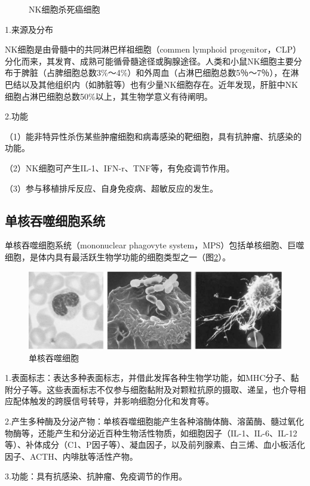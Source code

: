\begin{figure}[!htbp]
\begin{minipage}[b]{0.45\textwidth}
    \captionsetup{justification=centering}
    \caption{NK细胞杀死癌细胞}
    \label{fig2-20}
\end{minipage}
\end{figure} 

1.来源及分布

NK细胞是由骨髓中的共同淋巴样祖细胞（commen lymphoid
progenitor，CLP）分化而来，其发育、成熟可能循骨髓途径或胸腺途径。人类和小鼠NK细胞主要分布于脾脏（占脾细胞总数3\%～4\%）和外周血（占淋巴细胞总数5％～7％），在淋巴结以及其他组织内（如肺脏等）也有少量NK细胞存在。近年发现，肝脏中NK细胞占淋巴细胞总数50\%以上，其生物学意义有待阐明。

2.功能

（1）能非特异性杀伤某些肿瘤细胞和病毒感染的靶细胞，具有抗肿瘤、抗感染的功能。

（2）NK细胞可产生IL-1、IFN-r、TNF等，有免疫调节作用。

（3）参与移植排斥反应、自身免疫病、超敏反应的发生。


\subsection{单核吞噬细胞系统}

单核吞噬细胞系统（mononuclear phagovyte
system，MPS）包括单核细胞、巨噬细胞，是体内具有最活跃生物学功能的细胞类型之一（图\ref{fig2-21}）。

\begin{figure}[!htbp]
 \centering
 \includegraphics[width=.7\textwidth]{./images/Image00046.jpg}
 \caption{单核吞噬细胞}
 \label{fig2-21}
  \end{figure} 

1.表面标志：表达多种表面标志，并借此发挥各种生物学功能，如MHC分子、黏附分子等。这些表面标志不仅参与细胞黏附及对颗粒抗原的摄取、递呈，也介导相应配体触发的跨膜信号转导，并影响细胞分化和发育等。

2.产生多种酶及分泌产物：单核吞噬细胞能产生各种溶酶体酶、溶菌酶、髓过氧化物酶等，还能产生和分泌近百种生物活性物质，如细胞因子（IL-1、IL-6、IL-12等）、补体成分（C1、P因子等）、凝血因子，以及前列腺素、白三烯、血小板活化因子、ACTH、内啡肽等活性产物。

3.功能：具有抗感染、抗肿瘤、免疫调节的作用。


